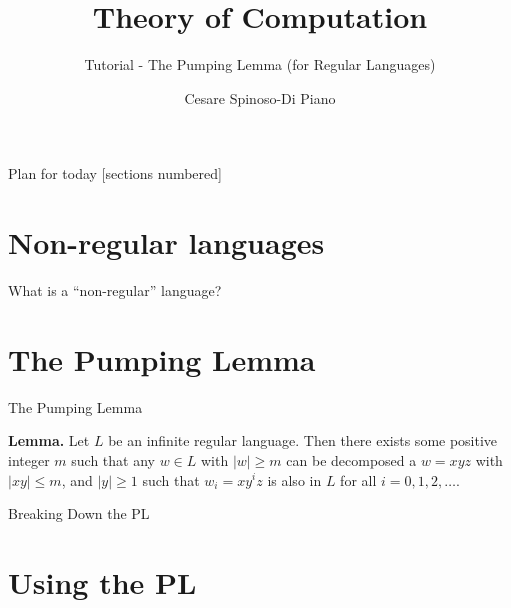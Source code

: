 \documentclass[10pt]{beamer}
\title{Theory of Computation}
\subtitle{Tutorial - The Pumping Lemma (for Regular Languages)}
\author{Cesare Spinoso-Di Piano}
\date{}
\begin{document}
\maketitle

\begin{frame}{Plan for today}
    [sections numbered]
    \tableofcontents[hideallsubsections]
\end{frame}


\section{Non-regular languages}

\begin{frame}{What is a ``non-regular'' language?}

\end{frame}

\section{The Pumping Lemma}

\begin{frame}{The Pumping Lemma}

    \textbf{Lemma.} Let $L$ be an infinite regular language. Then there exists some positive integer $m$ such that any $w \in L$ with $|w| \geq m$ can be decomposed a $w = xyz$ with $|xy| \leq m$, and
    $|y| \geq 1$ such that $w_i = x{y^i}z$ is also in $L$ for all $i = 0, 1, 2, \dots$.

\end{frame}

\begin{frame}{Breaking Down the PL}
\end{frame}

\section{Using the PL}
\end{document}

